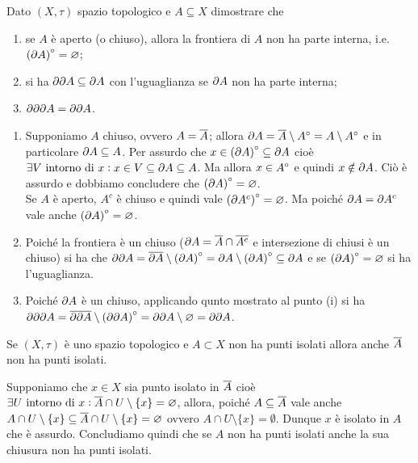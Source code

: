 \begin{es}
  Dato $ (X, \tau) $ spazio topologico e $ A \subseteq X $ dimostrare che
  \begin{enumerate}[label = (\roman*)]
  \item se $ A $ è aperto (o chiuso), allora la frontiera di $ A $ non ha parte interna, i.e. $ {(\partial{A})}^{\circ} = \varnothing $;
  \item si ha $ \partial{\partial{A}} \subseteq \partial{A} $ con l'uguaglianza se $ \partial{A} $ non ha parte interna;
  \item $ \partial{\partial{\partial{A}}} = \partial{\partial{A}} $.
  \end{enumerate}
\end{es}
%
\begin{enumerate}[label = (\roman*)]
\item Supponiamo $ A $ chiuso, ovvero $ A = \overline{A} $; allora $ \partial{A} = \overline{A} \setminus {A}^{\circ} = A \setminus {A}^{\circ} $ e in particolare $ \partial{A} \subseteq A $. Per assurdo che $ x \in {(\partial{A})}^{\circ} \subseteq \partial{A} $ cioè $ \exists V \text{ intorno di } x : x \in V \subseteq \partial{A} \subseteq A $. Ma allora $ x \in {A}^{\circ} $ e quindi $ x \notin \partial{A} $. Ciò è assurdo e dobbiamo concludere che $ {(\partial{A})}^{\circ} = \varnothing $. \\
  Se $ A $ è aperto, $ A^c $ è chiuso e quindi vale $ {(\partial{A^c})}^{\circ} = \varnothing $. Ma poiché $ \partial{A} = \partial{A^c} $ vale anche $ {(\partial{A})}^{\circ} = \varnothing $.
\item Poiché la frontiera è un chiuso ($ \partial{A} = \overline{A} \cap \overline{A^c} $ e intersezione di chiusi è un chiuso) si ha che $ \partial{\partial{A}} = \overline{\partial{A}} \setminus {(\partial{A})}^{\circ} = \partial{A} \setminus {(\partial{A})}^{\circ} \subseteq \partial{A} $ e se $ {(\partial{A})}^{\circ} = \varnothing $ si ha l'uguaglianza.
\item Poiché $ \partial{A} $ è un chiuso, applicando qunto mostrato al punto (i) si ha $ \partial{\partial{\partial{A}}} = \overline{\partial{\partial{A}}} \setminus {(\partial{\partial{A}})}^{\circ} = \partial{\partial{A}} \setminus \varnothing = \partial{\partial{A}} $.
\end{enumerate}

\begin{es}
  Se $ (X, \tau) $ è uno spazio topologico e $ A \subset X $ non ha punti isolati allora anche $ \overline{A} $ non ha punti isolati.
\end{es}
%
Supponiamo che $ x \in X $ sia punto isolato in $ \overline{A} $ cioè $ \exists U \text{ intorno di } x : \overline{A} \cap U \setminus \{x\} = \varnothing $, allora, poiché $ A \subseteq \overline{A} $ vale anche $ A \cap U \setminus \{x\} \subseteq \overline{A} \cap U \setminus \{x\} = \varnothing $ ovvero $ A \cap U \setminus \{x\} = \emptyset $. Dunque $ x $ è isolato in $ A $ che è assurdo. Concludiamo quindi che se $ A $ non ha punti isolati anche la sua chiusura non ha punti isolati.

